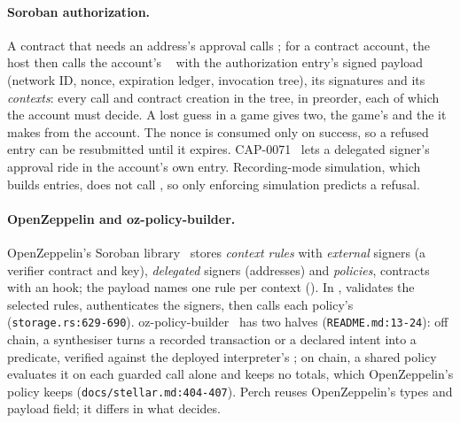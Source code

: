 \paragraph{Soroban authorization.} A contract that needs an address's approval
calls ; for a contract account, the host then calls the
account's ~\cite{cap-0046-11,stellar-custom-account} with
the authorization entry's signed payload (network ID, nonce, expiration ledger,
invocation tree), its signatures and its \emph{contexts}: every call and
contract creation in the tree, in preorder, each of which the account must
decide. A lost guess in a game gives two, the game's  and the
 it makes from the account. The nonce is consumed only on
success, so a refused entry can be resubmitted until it expires.
CAP-0071~\cite{cap-0071} lets a delegated signer's approval ride in the
account's own entry. Recording-mode simulation, which builds entries, does not
call , so only enforcing simulation predicts a refusal.

\paragraph{OpenZeppelin and oz-policy-builder.} OpenZeppelin's Soroban
library~\cite{oz-stellar-accounts} stores \emph{context rules} with
\emph{external} signers (a verifier contract and key), \emph{delegated} signers
(addresses) and \emph{policies}, contracts with an  hook; the
payload names one rule per context (). In
,  validates the selected rules,
authenticates the signers, then calls each policy's 
(\nolinkurl{storage.rs:629-690}). oz-policy-builder~\cite{oz-policy-builder} has two
halves (\nolinkurl{README.md:13-24}): off chain, a synthesiser turns a recorded
transaction or a declared intent into a predicate, verified against the deployed
interpreter's ; on chain, a shared  policy
evaluates it on each guarded call alone and keeps no totals, which OpenZeppelin's
 policy keeps (\nolinkurl{docs/stellar.md:404-407}). Perch
reuses OpenZeppelin's types and payload field; it differs in what decides.
